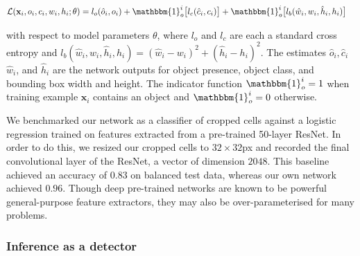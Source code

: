 \begin{align}
\mathcal{L}(\mathbf{x}_i, o_i, c_i, w_i, h_i;\theta) = l_{o}(\hat{o}_i, o_i) &+ \mathbbm{1}_{o}^{i}\big[l_{c}(\hat{c}_i, c_i)\big] + \mathbbm{1}_{o}^{i}\big[l_{b}(\hat{w}_i, w_i, \hat{h}_i, h_i)\big]
\end{align}

with respect to model parameters $\theta$, where $l_{o}$ and $l_{c}$ are each a standard cross entropy and $l_b(\hat{w}_i, w_i, \hat{h}_i, h_i) = (\hat{w}_i - w_i)^2 + (\hat{h}_i - h_i)^2$. The estimates $\hat{o}_i, \hat{c}_i$ $\hat{w}_i$, and $\hat{h}_i$ are the network outputs for object presence, object class, and bounding box width and height. The indicator function $\mathbbm{1}_o^i = 1$ when training example $\mathbf{x}_i$ contains an object and $\mathbbm{1}_o^i = 0$ otherwise.

We benchmarked our network as a classifier of cropped cells against a logistic regression trained on features extracted from a pre-trained 50-layer ResNet\cite{he2016deep}. In order to do this, we resized our cropped cells to $32 \times 32$px and recorded the final convolutional layer of the ResNet, a vector of dimension $2048$. This baseline achieved an accuracy of $0.83$ on balanced test data, whereas our own network achieved $0.96$. Though deep pre-trained networks are known to be powerful general-purpose feature extractors\cite{sharif2014cnn}, they may also be over-parameterised for many problems\cite{raghu2019transfusion}.

\subsubsection{Inference as a detector}
\label{subsubsec:inference}


